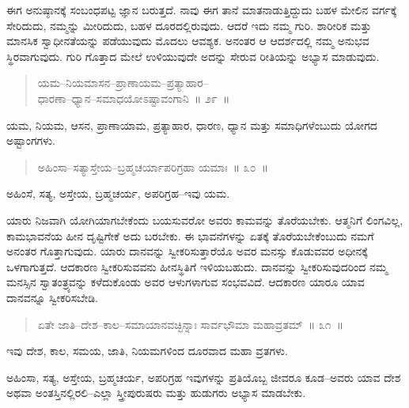 ಈಗ ಅನುಷ್ಠಾನಕ್ಕೆ ಸಂಬಂಧಪಟ್ಟ ಜ್ಞಾನ ಬರುತ್ತದೆ. ನಾವು ಈಗ ತಾನೆ ಮಾತನಾಡುತ್ತಿದ್ದುದು ಬಹಳ ಮೇಲಿನ ವರ್ಗಕ್ಕೆ ಸೇರಿದುದು, ನಮ್ಮನ್ನು ಮೀರಿದುದು, ಬಹಳ ದೂರದಲ್ಲಿರುವುದು. ಆದರೆ ಇದು ನಮ್ಮ ಗುರಿ. ಶಾರೀರಿಕ ಮತ್ತು ಮಾನಸಿಕ ಸ್ವಾಧೀನತೆಯನ್ನು ಪಡೆಯುವುದು ಮೊದಲು ಆವಶ್ಯಕ. ಅನಂತರ ಆ ಆದರ್ಶದಲ್ಲಿ ನಮ್ಮ ಅನುಭವ ಸ್ಥಿರ\break ವಾಗುವುದು. ಗುರಿ ಗೊತ್ತಾದ ಮೇಲೆ ಉಳಿಯುವುದೇ ಅದನ್ನು ಸೇರುವ ರೀತಿಯನ್ನು ಅಭ್ಯಾಸ ಮಾಡುವುದು. 

\vspace{-0.3cm}

\begin{verse}
ಯಮ–ನಿಯಮಾಸನ–ಪ್ರಾಣಾಯಮ–ಪ್ರತ್ಯಾಹಾರ–\\ಧಾರಣಾ–ಧ್ಯಾನ–ಸಮಾಧಯೋಽಷ್ಟಾವಂಗಾನಿ~॥ ೨೯~॥
\end{verse}

\vspace{-0.3cm}

ಯಮ, ನಿಯಮ, ಆಸನ, ಪ್ರಾಣಾಯಾಮ, ಪ್ರತ್ಯಾಹಾರ, ಧಾರಣ, ಧ್ಯಾನ ಮತ್ತು ಸಮಾಧಿಗಳೆಂಬುದು ಯೋಗದ ಅಷ್ಟಾಂಗಗಳು. 

\vspace{-0.3cm}

\begin{verse}
ಅಹಿಂಸಾ–ಸತ್ಯಾಸ್ತೇಯ–ಬ್ರಹ್ಮಚರ್ಯಾಪರಿಗ್ರಹಾ ಯಮಾಃ~॥ ೩೦~॥
\end{verse}

\vspace{-0.3cm}

ಅಹಿಂಸೆ, ಸತ್ಯ, ಅಸ್ತೇಯ, ಬ್ರಹ್ಮಚರ್ಯ, ಅಪರಿಗ್ರಹ–ಇವು ಯಮ. 

ಯಾರು ನಿಜವಾಗಿ ಯೋಗಿಯಾಗಬೇಕೆಂದು ಬಯಸುವರೋ ಅವರು ಕಾಮವನ್ನು ತೊರೆಯಬೇಕು. ಆತ್ಮನಿಗೆ ಲಿಂಗವಿಲ್ಲ, ಕಾಮಭಾವನೆಯ ಹೀನ ದೃಷ್ಟಿಗೇಕೆ ಅದು ಬರಬೇಕು. ಈ ಭಾವನೆಗಳನ್ನು ಏತಕ್ಕೆ ತೊರೆಯಬೇಕೆಂಬುದು ನಮಗೆ ಅನಂತರ ಗೊತ್ತಾಗುವುದು. ಯಾರು ದಾನವನ್ನು ಸ್ವೀಕರಿಸುತ್ತಾರೆಯೊ ಅವರ ಮನಸ್ಸು ಕೊಡುವವರ ಅಧೀನಕ್ಕೆ ಒಳಗಾಗುತ್ತದೆ. ಆದಕಾರಣ ಸ್ವೀಕರಿಸುವವನು ಹೀನಸ್ಥಿತಿಗೆ ಇಳಿಯಬಹುದು. ದಾನವನ್ನು ಸ್ವೀಕರಿಸುವುದರಿಂದ ನಮ್ಮ ಮನಸ್ಸಿನ ಸ್ವಾತಂತ್ರ್ಯವನ್ನು ಕಳೆದುಕೊಂಡು ಅವರ ಆಳುಗಳಾಗುವ ಸಂಭವವಿದೆ. ಆದಕಾರಣ ಯಾರೂ ಯಾವ ದಾನವನ್ನೂ ಸ್ವೀಕರಿಸಬೇಡಿ. 

\vspace{-0.3cm}

\begin{verse}
ಏತೇ ಜಾತಿ–ದೇಶ–ಕಾಲ–ಸಮಾಯಾನವಚ್ಛಿನ್ನಾಃ ಸಾರ್ವಭೌಮಾ ಮಹಾವ್ರತಮ್​~॥ ೩೧~॥
\end{verse}

\vspace{-0.3cm}

ಇವು ದೇಶ, ಕಾಲ, ಸಮಯ, ಜಾತಿ, ನಿಯಮಗಳಿಂದ ದೂರವಾದ ಮಹಾ ವ್ರತಗಳು. 

ಅಹಿಂಸಾ, ಸತ್ಯ, ಅಸ್ತೇಯ, ಬ್ರಹ್ಮಚರ್ಯ, ಅಪರಿಗ್ರಹ ಇವುಗಳನ್ನು ಪ್ರತಿಯೊಬ್ಬ ಜೀವರೂ ಕೂಡ–ಅವರು ಯಾವ ದೇಶ ಅಥವಾ ಅಂತಸ್ತಿನಲ್ಲಿರಲಿ–ಎಲ್ಲಾ ಸ್ತ್ರೀಪುರುಷರು ಮತ್ತು ಹುಡುಗರು ಅಭ್ಯಾಸ ಮಾಡಬೇಕು. 

